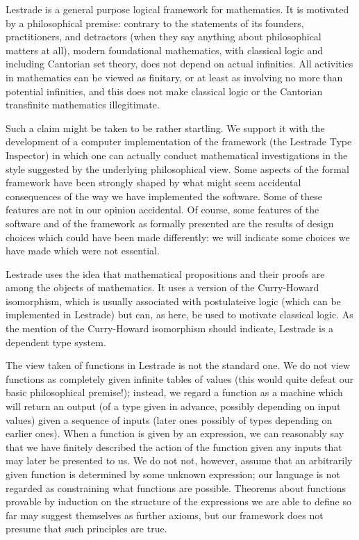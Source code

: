\documentclass[12pt]{article}
\begin{document}
Lestrade is a general purpose logical framework for mathematics.  It is motivated by a philosophical premise:  contrary to the statements of its founders, practitioners, and detractors (when they say anything about philosophical matters at all), modern foundational mathematics, with classical logic and including Cantorian set theory, does not depend on actual infinities.  All activities in mathematics can be viewed as finitary, or at least as involving no more than potential infinities, and this does not make classical logic or the Cantorian transfinite mathematics illegitimate.

Such a claim might be taken to be rather startling.  We support it with the development of a computer implementation of the framework (the Lestrade Type Inspector) in which one can actually conduct mathematical investigations in the style suggested by the underlying philosophical view.  Some aspects of the formal framework have been strongly shaped by what might seem accidental consequences of the way we have implemented the software.  Some of these features are not in our opinion accidental.  Of course, some features of the software and of the framework as formally presented are the results of design choices which could have been made differently:  we will indicate some choices we have made which were not essential.

Lestrade uses the idea that mathematical propositions and their proofs are among the objects of mathematics.  It uses a version of the Curry-Howard isomorphism, which is usually associated with postulateive logic (which can be implemented in Lestrade) but can, as here, be used to motivate classical logic.
As the mention of the Curry-Howard isomorphism should indicate, Lestrade is a dependent type system.

The view taken of functions in Lestrade is not the standard one.  We do not view functions as completely given infinite tables of values (this would quite defeat our basic philosophical premise!); instead, we regard a function as a machine which will return an output (of a type given in advance, possibly depending on input values) given a sequence of inputs (later ones possibly of types depending on earlier ones).  When a function is given by an expression, we can reasonably say that we have finitely described the action of the function given any inputs that may later be presented to us.  We do not not, however, assume that an arbitrarily given function is determined by some unknown expression;  our language is not regarded as constraining what functions are possible.  Theorems about functions provable by induction on the structure of the expressions we are able to define so far may suggest themselves as further axioms, but our framework does not presume that such principles are true.
\end{document}
